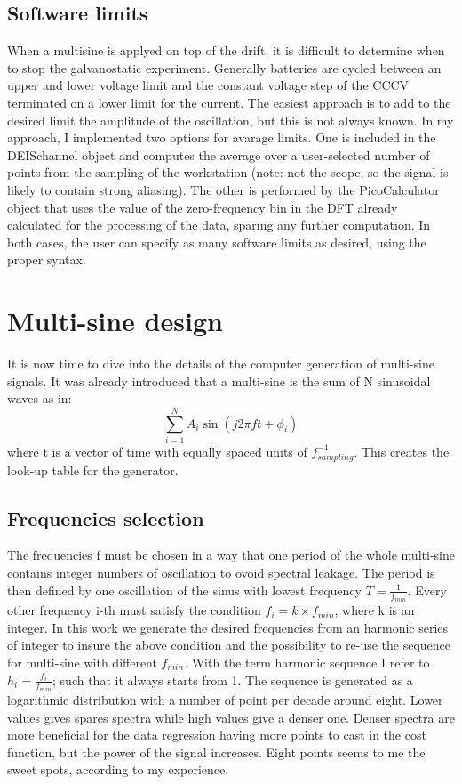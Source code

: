 \subsection{Software limits}
When a multisine is applyed on top of the drift, it is difficult to determine when to stop the galvanostatic experiment. Generally batteries are cycled between an upper and lower voltage limit and the constant voltage step of the CCCV terminated on a lower limit for the current. The easiest approach is to add to the desired limit the amplitude of the oscillation, but this is not always known. In my approach, I implemented two options for avarage limits. One is included in the DEISchannel object and computes the average over a user-selected number of points from the sampling of the workstation (note: not the scope, so the signal is likely to contain strong aliasing). The other is performed by the PicoCalculator object that uses the value of the zero-frequency bin in the DFT already calculated for the processing of the data, sparing any further computation. In both cases, the user can specify as many software limits as desired, using the proper syntax.
\section{Multi-sine design}

It is now time to dive into the details of the computer generation of multi-sine signals. It was already introduced that a multi-sine is the sum of N sinusoidal waves as in: 
$$
\sum _{i=1}^N A_i \sin(j2\pi f t+\phi_i)
$$
where t is a vector of time with equally spaced units of $f_{sampling}^{-1}$. This creates the look-up table for the generator.\\

\subsection{Frequencies selection}
The frequencies f must be chosen in a way that one period of the whole multi-sine contains integer numbers of oscillation to ovoid spectral leakage. The period is then defined by one oscillation of the sinus with lowest frequency $T=\frac{1}{f_{min}}$.  Every other frequency i-th must satisfy the condition $f_i=k\times f_{min}$, where k is an integer. In this work we generate the desired frequencies from an harmonic series of integer to insure the above condition and the possibility to re-use the sequence for multi-sine with different $f_{min}$. With the term harmonic sequence I refer to $h_i =\frac{f_i}{f_{min}}$; such that it always starts from 1. The sequence is generated as a logarithmic distribution with a number of point per decade around eight. Lower values gives spares spectra while high values give a denser one. Denser spectra are more beneficial for the data regression having more points to cast in the cost function, but the power of the signal increases. Eight points seems to me the sweet spots, according to my experience.\\

